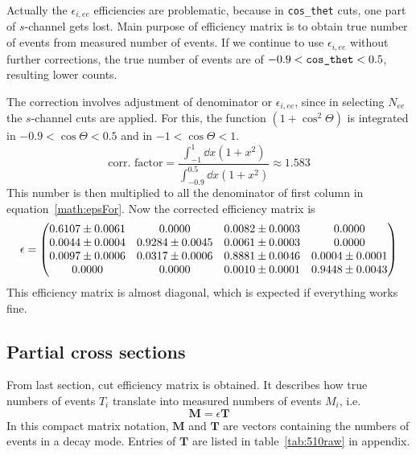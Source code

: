Actually the $\epsilon_{i, ee}$ efficiencies are problematic, because in \verb|cos_thet| cuts, one part of $s$-channel gets lost. Main purpose of efficiency matrix is to obtain true number of events from measured number of events. If we continue to use $\epsilon_{i, ee}$ without further corrections, the true number of events are of $-0.9 < \verb|cos_thet| < 0.5$, resulting lower counts. 

The correction involves adjustment of denominator or $\epsilon_{i, ee}$, since in selecting $N_{ee}$ the $s$-channel cuts are applied. For this, the function $(1+\cos^2\Theta)$ is integrated in $-0.9 < \cos\Theta < 0.5 $  and in $-1 < \cos\Theta < 1$.
\begin{equation}
	\text{corr. factor} = \frac{\int_{-1}^{1} \dd{x} (1+x^2)}{ \int_{-0.9}^{0.5}\dd{x} (1+x^2)} \approx \num{1.583}
\end{equation}
This number is then multiplied to all the denominator of first column in equation~\ref{math:epsFor}. Now the corrected efficiency matrix is
\begin{equation}
	\epsilon = \begin{pmatrix} \num{0.6107 +- 0.0061} & \num{0.0000 +- 0.0000} & \num{0.0082 +- 0.0003} & \num{0.0000 +- 0.0000} \\ 
								\num{0.0044 +- 0.0004} & \num{0.9284 +- 0.0045} & \num{0.0061 +- 0.0003} & \num{0.0000 +- 0.0000} \\
								\num{0.0097 +- 0.0006} & \num{0.0317 +- 0.0006} & \num{0.8881 +- 0.0046} & \num{0.0004 +- 0.0001} \\
								\num{0.0000 +- 0.0000} & \num{0.0000 +- 0.0000} & \num{0.0010 +- 0.0001} & \num{0.9448 +- 0.0043} 
	\end{pmatrix}
\end{equation}
This efficiency matrix is almost diagonal, which is expected if everything works fine.


\subsection{Partial cross sections}
From last section, cut efficiency matrix is obtained. It describes how true numbers of events $T_i$ translate into measured numbers of events $M_i$, i.e.
\begin{equation}
	\mathbf{M} = \epsilon \mathbf{T}
\end{equation}
In this compact matrix notation, $\mathbf{M}$ and $\mathbf{T}$ are vectors containing the numbers of events in a decay mode. Entries of $\mathbf{T}$ are listed in table~\ref{tab:510raw} in appendix.

